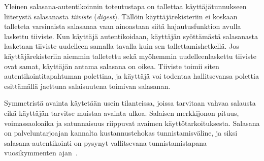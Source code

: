 \documentclass[finnish,gradu]{tktltiki}
\begin{document}
  Yleinen salasana-autentikoinnin toteutustapa on tallettaa käyttäjätunnukseen liitetystä salasanasta \emph{tiiviste} (\emph{digest}). Tällöin käyttäjärekisteriin ei koskaan talleteta varsinaista salasanaa vaan ainoastaan siitä hajautusfunktion avulla laskettu tiiviste. Kun käyttäjä autentikoidaan, käyttäjän syöttämästä salasanasta lasketaan tiiviste uudelleen samalla tavalla kuin sen tallettamishetkellä. Jos käyttäjärekisteriin aiemmin talletettu sekä myöhemmin uudelleenlaskettu tiiviste ovat samat, käyttäjän antama salasana on oikea. Tiiviste toimii siten autentikointitapahtuman polettina, ja käyttäjä voi todentaa hallitsevansa polettia esittämällä jaettuna salaisuutena toimivan salasanan.

  Symmetristä avainta käytetään usein tilanteissa, joissa tarvitaan vahvaa salausta eikä käyttäjän tarvitse muistaa avainta ulkoa. Salaisen merkkijonon pituus, voimassaoloaika ja satunnaisuus riippuvat  avaimen käyttötarkoituksesta. Salasana on palveluntarjoajan kannalta kustannustehokas tunnistamisväline, ja siksi salasana-autentikointi on pysynyt vallitsevana tunnistamistapana vuosikymmenten ajan~\cite{pw_auth_system_perspective_08}.


\end{document}
